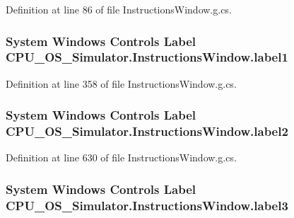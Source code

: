 Definition at line 86 of file Instructions\+Window.\+g.\+cs.

\hypertarget{class_c_p_u___o_s___simulator_1_1_instructions_window_a499640eb8a98693f1833dad30f5d8cb4}{}
\subsubsection[{label1}]{\setlength{\rightskip}{0pt plus 5cm}System Windows Controls Label C\+P\+U\+\_\+\+O\+S\+\_\+\+Simulator.\+Instructions\+Window.\+label1\hspace{0.3cm}{\ttfamily [package]}}\label{class_c_p_u___o_s___simulator_1_1_instructions_window_a499640eb8a98693f1833dad30f5d8cb4}


Definition at line 358 of file Instructions\+Window.\+g.\+cs.

\hypertarget{class_c_p_u___o_s___simulator_1_1_instructions_window_a237621e58e68c4a07cdf8803cc1614fd}{}
\subsubsection[{label2}]{\setlength{\rightskip}{0pt plus 5cm}System Windows Controls Label C\+P\+U\+\_\+\+O\+S\+\_\+\+Simulator.\+Instructions\+Window.\+label2\hspace{0.3cm}{\ttfamily [package]}}\label{class_c_p_u___o_s___simulator_1_1_instructions_window_a237621e58e68c4a07cdf8803cc1614fd}


Definition at line 630 of file Instructions\+Window.\+g.\+cs.

\hypertarget{class_c_p_u___o_s___simulator_1_1_instructions_window_a394b28c312ae1a83128da41990fc5d32}{}
\subsubsection[{label3}]{\setlength{\rightskip}{0pt plus 5cm}System Windows Controls Label C\+P\+U\+\_\+\+O\+S\+\_\+\+Simulator.\+Instructions\+Window.\+label3\hspace{0.3cm}{\ttfamily [package]}}\label{class_c_p_u___o_s___simulator_1_1_instructions_window_a394b28c312ae1a83128da41990fc5d32}


